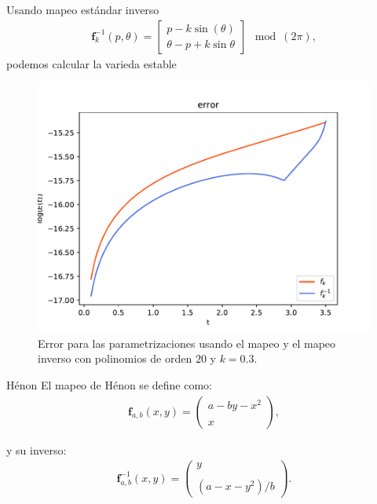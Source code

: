 \documentclass[11pt]{beamer}
\theoremstyle{definition}
\begin{document}
\begin{frame}
Usando mapeo est\'andar inverso
\begin{eqnarray}
\mathbf{f}_{k}^{-1}(p,\theta) = \left[\begin{array}{c}
p  -k\sin(\theta) \\
\theta-p+k\sin{\theta}
\end{array}\right] \mod(2\pi), \label{mapeo estandar inverso}
\end{eqnarray}
podemos calcular la varieda estable
\begin{figure}[H]
\centering
\includegraphics[scale=0.4]{error_inversa}
\caption{Error para las parametrizaciones usando el mapeo y el mapeo inverso con polinomios de orden $20$ y $k=0.3$. }
\label{erroresinverso}
\end{figure}
\end{frame}
\begin{frame}{H\'enon}
El mapeo de Hénon se define como:
\begin{eqnarray}
\mathbf{f}_{a,b}(x,y)=\left( \begin{array}{lcc}
a-by-x^{2}\\
\\ x
\end{array}
\right), \label{Henon}
\end{eqnarray}

y su inverso:
\begin{eqnarray}
\mathbf{f}^{-1}_{a,b}(x,y)=\left( \begin{array}{lcc}
y\\
\\ (a-x-y^{2})/b
\end{array}
\right). \label{HenonI}
\end{eqnarray} 


\end{frame}
\end{document}
